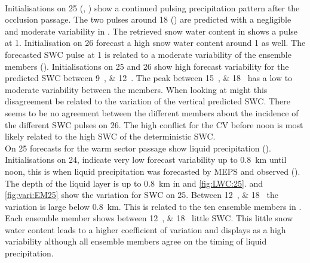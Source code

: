 \\
Initialisations on \SI{25}{\dec} (, ) show a continued pulsing precipitation pattern after the occlusion passage. The two pulses around \SI{18}{\UTC} () are predicted with a negligible and moderate variability in . %
The retrieved snow water content in  shows a pulse at \SI{1}{\UTC}.
Initialisation on \SI{26}{\dec} forecast a high snow water content around \SI{1}{\UTC} as well. The forecasted SWC pulse at \SI{1}{\UTC} is related to a moderate variability of the ensemble members (). 
Initialisations on \num{25} and \SI{26}{\dec} show high forecast variability for the predicted SWC between \SIlist{9;12}{\UTC}. The peak between \SIlist{15;18}{\UTC} has a low to moderate variability between the members. When looking at  might this disagreement be related to the variation of the vertical predicted SWC. There seems to be no agreement between the different members about the incidence of the different SWC pulses on \SI{26}{\dec}. The high conflict for the CV before noon is most likely related to the high SWC of the deterministic SWC.
\\
On \SI{25}{\dec} forecasts for the warm sector passage show liquid precipitation ().
%
Initialisations on \SI{24}{\dec}, indicate very low forecast variability up to \SI{0.8}{\km} until noon, this is when liquid precipitation was forecasted by MEPS and observed ().
The depth of the liquid layer is up to \SI{0.8}{\km} in  and \ref{fig:LWC:25}. 
 and \ref{fig:vari:EM25} show the variation for SWC on \SI{25}{\dec}. Between \SIlist{12;18}{\UTC} the variation is large below \SI{0.8}{\km}. This is related to the ten ensemble members in . Each ensemble member shows between \SIlist{12;18}{\UTC} little SWC. This little snow water content leads to a higher coefficient of variation and displays as a high variability although all ensemble members agree on the timing of liquid precipitation.
